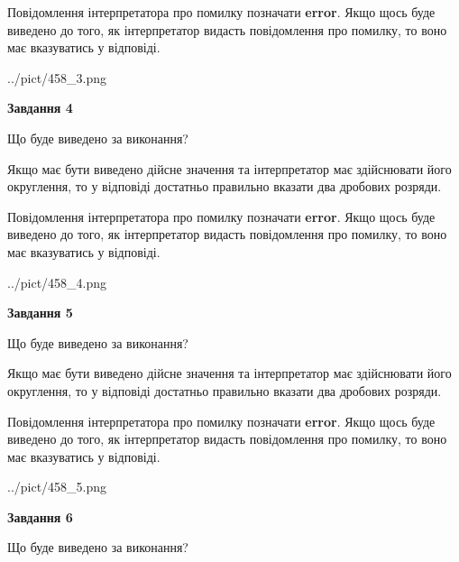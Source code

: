 \documentclass[12pt, ukrainian]{article}
\begin{document}
{\begin {Large}
Повідомлення інтерпретатора про помилку позначати \textbf{error}.
Якщо щось буде виведено до того, як інтерпретатор видасть повідомлення про помилку, 
то воно має вказуватись у відповіді. \par

\begin{center}
	{../pict/458_3.png}
\end{center}
\newpage

{\begin {center}\textbf{Завдання 4}\end {center}}\par
Що буде виведено за виконання? \par

Якщо має бути виведено дійсне значення та інтерпретатор має здійснювати його округлення, 
то у відповіді достатньо правильно вказати два дробових розряди.

Повідомлення інтерпретатора про помилку позначати \textbf{error}.
Якщо щось буде виведено до того, як інтерпретатор видасть повідомлення про помилку, 
то воно має вказуватись у відповіді. \par

\begin{center}
	{../pict/458_4.png}
\end{center}
\newpage

{\begin {center}\textbf{Завдання 5}\end {center}}\par
Що буде виведено за виконання? \par

Якщо має бути виведено дійсне значення та інтерпретатор має здійснювати його округлення, 
то у відповіді достатньо правильно вказати два дробових розряди.

Повідомлення інтерпретатора про помилку позначати \textbf{error}.
Якщо щось буде виведено до того, як інтерпретатор видасть повідомлення про помилку, 
то воно має вказуватись у відповіді. \par

\begin{center}
	{../pict/458_5.png}
\end{center}
\newpage

{\begin {center}\textbf{Завдання 6}\end {center}}\par
Що буде виведено за виконання? \par


\end{Large}}
\end{document}
